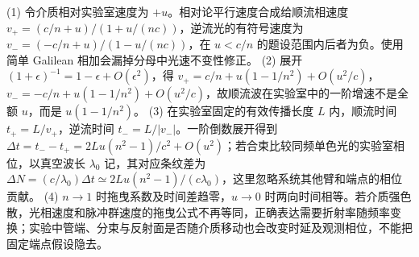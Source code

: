 (1) 令介质相对实验室速度为 \(+u\)。相对论平行速度合成给顺流相速度 \(v_+=(c/n+u)/(1+u/(nc))\)，逆流光的有符号速度为 \(v_-=(-c/n+u)/(1-u/(nc))\)，在 \(u<c/n\) 的题设范围内后者为负。使用简单 Galilean 相加会漏掉分母中光速不变性修正。
(2) 展开 \((1+\epsilon)^{-1}=1-\epsilon+O(\epsilon^2)\)，得 \(v_+=c/n+u(1-1/n^2)+O(u^2/c)\)，\(v_-=-c/n+u(1-1/n^2)+O(u^2/c)\)，故顺流波在实验室中的一阶增速不是全额 \(u\)，而是 \(u(1-1/n^2)\)。
(3) 在实验室固定的有效传播长度 \(L\) 内，顺流时间 \(t_+=L/v_+\)，逆流时间 \(t_-=L/|v_-|\)。一阶倒数展开得到 \(\Delta t=t_--t_+=2Lu(n^2-1)/c^2+O(u^2)\)；若合束比较同频单色光的实验室相位，以真空波长 \(\lambda_0\) 记，其对应条纹差为 \(\Delta N=(c/\lambda_0)\Delta t\simeq2Lu(n^2-1)/(c\lambda_0)\)，这里忽略系统其他臂和端点的相位贡献。
(4) \(n\to1\) 时拖曳系数及时间差趋零，\(u\to0\) 时两向时间相等。若介质强色散，光相速度和脉冲群速度的拖曳公式不再等同，正确表达需要折射率随频率变换；实验中管端、分束与反射面是否随介质移动也会改变时延及观测相位，不能把固定端点假设隐去。
